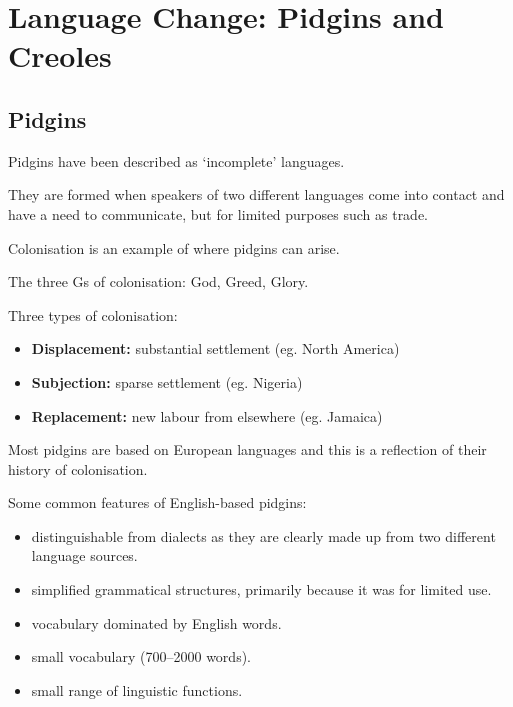 \documentclass[../main.tex]{subfiles}
\begin{document}
    \section{Language Change: Pidgins and Creoles}

    \subsection{Pidgins}
    Pidgins have been described as `incomplete' languages. \par
    They are formed when speakers of two different languages come into contact and have a need to communicate, but for limited purposes such as trade. \par
    Colonisation is an example of where pidgins can arise. \par
    
    The three Gs of colonisation: God, Greed, Glory.

    Three types of colonisation: 
    \begin{itemize}
        \item \textbf{Displacement:} substantial settlement (eg. North America)
        \item \textbf{Subjection:} sparse settlement (eg. Nigeria)
        \item \textbf{Replacement:} new labour from elsewhere (eg. Jamaica)
    \end{itemize}
    Most pidgins are based on European languages and this is a reflection of their history of colonisation.


    Some common features of English-based pidgins:
    \begin{itemize}
        \item distinguishable from dialects as they are clearly made up from two different language sources.
        \item simplified grammatical structures, primarily because it was for limited use.
        \item vocabulary dominated by English words.
        \item small vocabulary (700--2000 words).
        \item small range of linguistic functions.
    \end{itemize}
\end{document}
